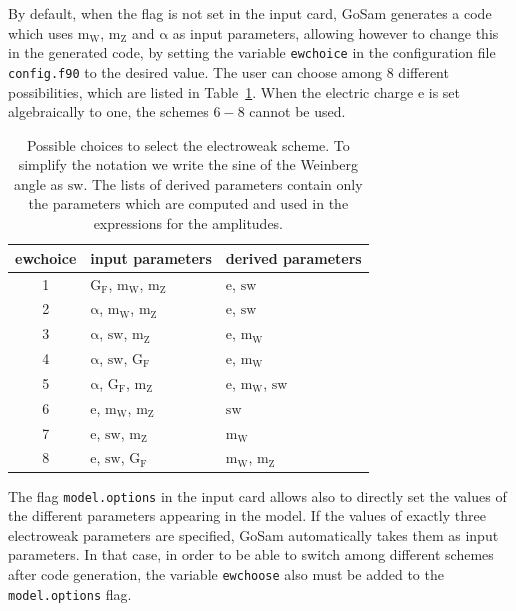 \documentclass[11pt,a4paper]{refrep}
\newcommand{\gosam}{{\sc GoSam}\xspace}
\newcommand{\mrm}[1]{\mathrm{#1}}
\begin{document}
By default, when the flag is not set in the input card, \gosam{}
generates a code which uses $\mrm{m_W}$, $\mrm{m_Z}$ and
$\mrm{\alpha}$ as input parameters, allowing however to change this in
the generated code, by setting the variable {\tt ewchoice} in the
configuration file {\tt config.f90} to the desired value. The user can
choose among 8 different possibilities, which are listed in
Table~\ref{tab:ewchoose}.  When the electric charge $\mrm{e}$ is set
algebraically to one, the schemes $6-8$ cannot be used.

\begin{table}
\begin{center}
\small
\begin{tabular}{|c|l|l|}
\hline
ewchoice & input parameters                        & derived parameters                  \\
\hline
1        & $\mrm{G_F}$, $\mrm{m_W}$, $\mrm{m_Z}$    & $\mrm{e}$, $\mrm{sw}$              \\
2        & $\mrm{\alpha}$, $\mrm{m_W}$, $\mrm{m_Z}$ & $\mrm{e}$, $\mrm{sw}$              \\
3        & $\mrm{\alpha}$, $\mrm{sw}$, $\mrm{m_Z}$  & $\mrm{e}$, $\mrm{m_W}$             \\
4        & $\mrm{\alpha}$, $\mrm{sw}$, $\mrm{G_F}$  & $\mrm{e}$, $\mrm{m_W}$             \\
5        & $\mrm{\alpha}$, $\mrm{G_F}$, $\mrm{m_Z}$ & $\mrm{e}$, $\mrm{m_W}$, $\mrm{sw}$ \\
6        & $\mrm{e}$, $\mrm{m_W}$, $\mrm{m_Z}$      & $\mrm{sw}$                         \\
7        & $\mrm{e}$, $\mrm{sw}$, $\mrm{m_Z}$       & $\mrm{m_W}$                        \\
8        & $\mrm{e}$, $\mrm{sw}$, $\mrm{G_F}$       & $\mrm{m_W}$, $\mrm{m_Z}$           \\
\hline
\end{tabular}
\end{center}
\caption{Possible choices to select the electroweak scheme.
To simplify the notation we write the sine of the Weinberg angle as
$\mrm{sw}$. The lists of derived parameters contain only the
parameters which are computed and used in the expressions for the
amplitudes.}\label{tab:ewchoose}
\end{table}


The flag {\tt model.options} in the input card allows also to directly
set the values of the different parameters appearing in the model. If
the values of exactly three electroweak parameters are
specified, \gosam{} automatically takes them as input parameters. In
that case, in order to be able to switch among different schemes after
code generation, the variable {\tt ewchoose} also must be added to the
{\tt model.options} flag.
\end{document}
